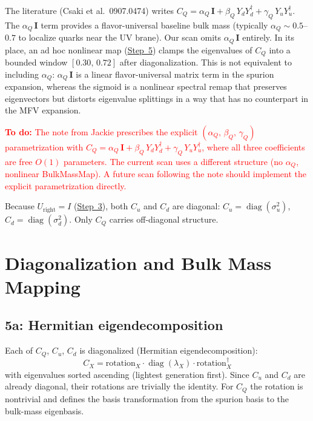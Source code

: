 \documentclass[11pt]{article}
\begin{document}
The literature
(Csaki et al.\ 0907.0474) writes
$C_Q = \alpha_Q\,\mathbf{I} + \beta_Q\,Y_d Y_d^\dagger +
\gamma_Q\,Y_u Y_u^\dagger$.
The $\alpha_Q\,\mathbf{I}$ term provides a flavor-universal baseline bulk mass
(typically $\alpha_Q \sim 0.5$--$0.7$ to localize quarks near the UV brane).
Our scan omits $\alpha_Q\,\mathbf{I}$ entirely.  In its place, an ad hoc
nonlinear map (\hyperref[sec:step5]{Step~5}) clamps the eigenvalues of $C_Q$
into a bounded window $[0.30,\,0.72]$ after diagonalization. This is not
equivalent to including $\alpha_Q$: $\alpha_Q\,\mathbf{I}$ is a linear
flavor-universal matrix term in the spurion expansion, whereas the sigmoid is
a nonlinear spectral remap that preserves eigenvectors but distorts eigenvalue
splittings in a way that has no counterpart in the MFV expansion.

\textcolor{red}{\textbf{To do:} The note from Jackie prescribes the explicit
$(\alpha_Q,\,\beta_Q,\,\gamma_Q)$ parametrization with $C_Q =
\alpha_Q\,\mathbf{I} + \beta_Q\,Y_d Y_d^\dagger + \gamma_Q\,Y_u Y_u^\dagger$,
where all three coefficients are free $O(1)$ parameters.  The current scan uses
a different structure (no $\alpha_Q$, nonlinear BulkMassMap).  A future scan
following the note should implement the explicit parametrization directly.}

Because $U_{\mathrm{right}} = I$ (\hyperref[sec:step3]{Step~3}), both $C_u$ and
$C_d$ are diagonal: $C_u = \operatorname{diag}(\sigma_u^2)$,
$C_d = \operatorname{diag}(\sigma_d^2)$.  Only $C_Q$ carries off-diagonal
structure.

\section{Diagonalization and Bulk Mass Mapping}
\label{sec:step5}

\subsection{5a: Hermitian eigendecomposition}
\label{sec:step5a}

Each of $C_Q$, $C_u$, $C_d$ is diagonalized (Hermitian eigendecomposition):
\begin{equation}
  C_X = \text{rotation}_X \cdot \operatorname{diag}(\lambda_X)
    \cdot \text{rotation}_X^\dagger
\end{equation}
with eigenvalues sorted ascending (lightest generation first).  Since $C_u$ and
$C_d$ are already diagonal, their rotations are trivially the identity.  For
$C_Q$ the rotation is nontrivial and defines the basis transformation from the
spurion basis to the bulk-mass eigenbasis.
\end{document}
